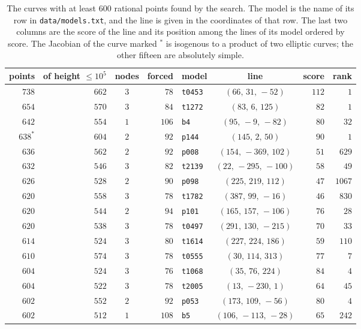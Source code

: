 \documentclass[11pt]{article}
\theoremstyle{remark}
\begin{document}
\begin{table}[h]
\centering
\begin{tabular}{rrcrlcrr}
\toprule
points & of height $\le10^5$ & nodes & forced & model & line & score & rank\\
\midrule
$738$ & $662$ & $3$ & $78$ & \texttt{t0453} & $(66,\,31,\,-52)$ & $112$ & $1$\\
$654$ & $570$ & $3$ & $84$ & \texttt{t1272} & $(83,\,6,\,125)$ & $82$ & $1$\\
$642$ & $554$ & $1$ & $106$ & \texttt{b4} & $(95,\,-9,\,-82)$ & $80$ & $32$\\
$638^{*}$ & $604$ & $2$ & $92$ & \texttt{p144} & $(145,\,2,\,50)$ & $90$ & $1$\\
$636$ & $562$ & $2$ & $92$ & \texttt{p008} & $(154,\,-369,\,102)$ & $51$ & $629$\\
$632$ & $546$ & $3$ & $82$ & \texttt{t2139} & $(22,\,-295,\,-100)$ & $58$ & $49$\\
$626$ & $528$ & $2$ & $90$ & \texttt{p098} & $(225,\,219,\,112)$ & $47$ & $1067$\\
$620$ & $558$ & $3$ & $78$ & \texttt{t1782} & $(387,\,99,\,-16)$ & $46$ & $830$\\
$620$ & $544$ & $2$ & $94$ & \texttt{p101} & $(165,\,157,\,-106)$ & $76$ & $28$\\
$620$ & $538$ & $3$ & $78$ & \texttt{t0497} & $(291,\,130,\,-215)$ & $70$ & $33$\\
$614$ & $524$ & $3$ & $80$ & \texttt{t1614} & $(227,\,224,\,186)$ & $59$ & $110$\\
$610$ & $574$ & $3$ & $78$ & \texttt{t0555} & $(30,\,114,\,313)$ & $77$ & $7$\\
$604$ & $524$ & $3$ & $76$ & \texttt{t1068} & $(35,\,76,\,224)$ & $84$ & $4$\\
$604$ & $522$ & $3$ & $78$ & \texttt{t2005} & $(13,\,-230,\,1)$ & $64$ & $45$\\
$602$ & $552$ & $2$ & $92$ & \texttt{p053} & $(173,\,109,\,-56)$ & $80$ & $4$\\
$602$ & $512$ & $1$ & $108$ & \texttt{b5} & $(106,\,-113,\,-28)$ & $65$ & $242$\\
\bottomrule
\end{tabular}
\caption{The curves with at least $600$ rational points found by the search.  The model is the name of its row in
\texttt{data/models.txt}, and the line is given in the coordinates of that row.  The last two columns are the score of the line and
its position among the lines of its model ordered by score.  The
Jacobian of the curve marked $^*$ is isogenous to a product of two elliptic curves; the other fifteen are absolutely simple.}
\label{tab:top}
\end{table}
\end{document}
